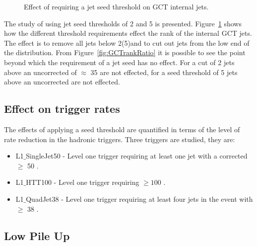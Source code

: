 \begin{figure}[h!]
    \centering
    \caption{Effect of requiring a jet seed threshold on GCT internal jets.}
    \label{fig:GCTrank}
\end{figure}

The study of using jet seed thresholds of 2 and 5 \GeV is presented.
Figure~\ref{fig:GCTrank} shows how the different threshold requirements effect 
the rank of the internal GCT jets. The effect is to remove all jets below 
2(5)\GeV and to cut out jets from the low end of the distribution. From 
Figure~\ref{fig:GCTrankRatio} it is possible to see the point beyond which the 
requirement of a jet seed has no effect. For a cut of 2 \GeV jets above an 
uncorrected \ET of $\approx$ 35 \GeV are not effected, for a seed threshold of 
5 \GeV jets above an uncorrected  \GeV are not effected.


\subsection{Effect on trigger rates} %
\label{sec:Effects on Rate}
The effects of applying a seed threshold are quantified in terms of the level of rate
reduction in the \Lone hadronic triggers.
Three triggers are studied, they are:
\begin{itemize}
  \item L1$\_$SingleJet50 - Level one trigger requiring at least one jet with a 
  corrected \ET $\geq$ 50 \GeV.
  \item L1$\_$HTT100 - Level one trigger requiring \HT $\geq 100$ \GeV.
  \item L1$\_$QuadJet38 - Level one trigger requiring at least four jets in the 
  event with \ET $\geq$ 38 \GeV.
\end{itemize}
\subsection{Low Pile Up} %
\label{sub:Low Pile Up}

